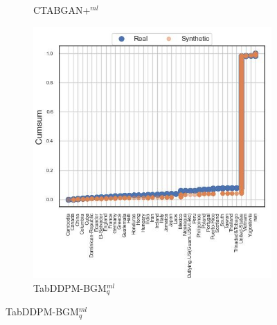 \begin{figure}[H]
\begin{subfigure}{0.32\textwidth}
		\caption{CTABGAN+$^{ml}$}
	\end{subfigure}
	\begin{subfigure}{0.32\textwidth}
		\centering
		\includegraphics[width=\textwidth]{images/cdf/tab-ddpm-bgm.jpg}
		\caption{TabDDPM-BGM$^{ml}_q$}
	\end{subfigure}



\end{figure}
